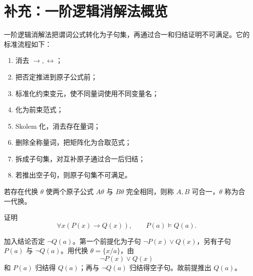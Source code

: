 \section{补充：一阶逻辑消解法概览}

一阶逻辑消解法把谓词公式转化为子句集，再通过合一和归结证明不可满足。它的标准流程如下：
\begin{enumerate}
  \item 消去 $\to,\leftrightarrow$；
  \item 把否定推进到原子公式前；
  \item 标准化约束变元，使不同量词使用不同变量名；
  \item 化为前束范式；
  \item Skolem 化，消去存在量词；
  \item 删除全称量词，把矩阵化为合取范式；
  \item 拆成子句集，对互补原子通过合一后归结；
  \item 若推出空子句，则原子句集不可满足。
\end{enumerate}

\begin{definition}[合一]\label{ch2-unification}
若存在代换 $\theta$ 使两个原子公式 $A\theta$ 与 $B\theta$ 完全相同，则称 $A,B$ 可合一，$\theta$ 称为合一代换。
\end{definition}

\begin{example}[title={一阶归结示例}]\label{ch2-first-order-resolution}
证明
\[
\forall x(P(x)\to Q(x)),\qquad P(a)\vDash Q(a).
\]
\begin{solution}
加入结论否定 $\neg Q(a)$。第一个前提化为子句 $\neg P(x)\lor Q(x)$，另有子句 $P(a)$ 与 $\neg Q(a)$。用代换 $\theta=\{x/a\}$，由
\[
\neg P(x)\lor Q(x)
\]
和 $P(a)$ 归结得 $Q(a)$；再与 $\neg Q(a)$ 归结得空子句。故前提推出 $Q(a)$。
\end{solution}
\end{example}
